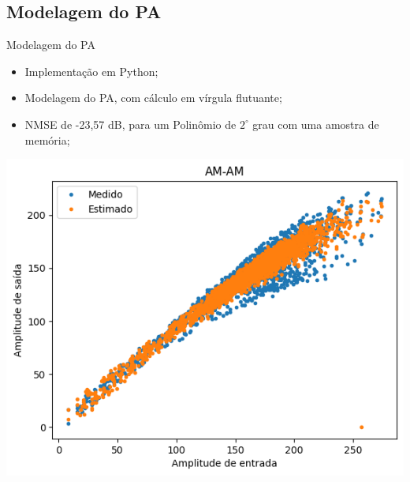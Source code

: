 \documentclass{if-beamer}
\begin{document}
\subsection{Modelagem do PA}
\begin{frame}{Modelagem do PA}
	
	
	\begin{minipage}{0.5\textwidth}
		\begin{itemize}
			\item  Implementação em Python;
			\item Modelagem do PA, com cálculo em vírgula flutuante;
			\item NMSE de -23,57 dB, para um Polinômio de $2^\circ$ grau com uma amostra de memória;
		\end{itemize}
	\end{minipage}%
	\hspace{0.04\textwidth}
	\begin{minipage}{0.5\textwidth}
		
		\includegraphics[scale=0.4]{modeloPA.png}
		
	\end{minipage}%
\end{frame}
\end{document}
